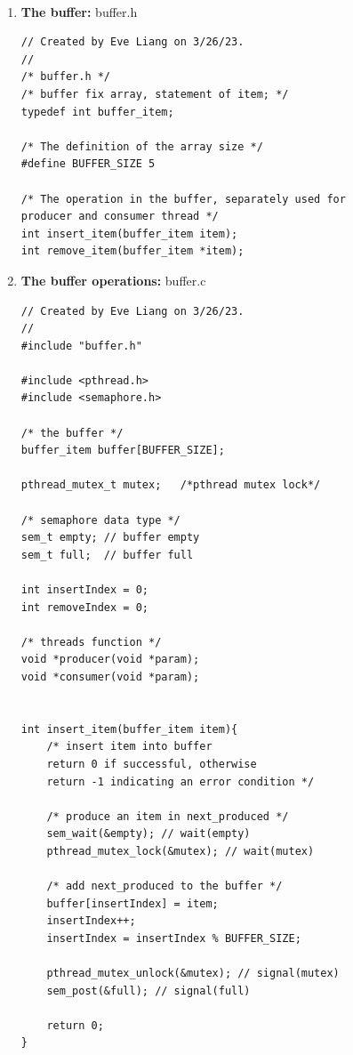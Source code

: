 \documentclass[12pt]{article}
\newenvironment{sol}[1][Solution]{\begin{trivlist}\item[\hskip\labelsep {\bfseries #1:}]}{\end{trivlist}}
\begin{document}
    \begin{sol}
    \hspace*{\fill}\\
    \begin{enumerate}
        \item[(a)]     \textbf{The buffer:}    buffer.h
    \begin{verbatim}
// Created by Eve Liang on 3/26/23.
//
/* buffer.h */
/* buffer fix array, statement of item; */
typedef int buffer_item;

/* The definition of the array size */
#define BUFFER_SIZE 5        

/* The operation in the buffer, separately used for 
producer and consumer thread */
int insert_item(buffer_item item);
int remove_item(buffer_item *item);
    \end{verbatim}

\item[(b)]\textbf{The buffer operations:} buffer.c
    \begin{verbatim}
// Created by Eve Liang on 3/26/23.
//
#include "buffer.h"

#include <pthread.h>
#include <semaphore.h>

/* the buffer */
buffer_item buffer[BUFFER_SIZE];

pthread_mutex_t mutex;   /*pthread mutex lock*/

/* semaphore data type */
sem_t empty; // buffer empty
sem_t full;  // buffer full

int insertIndex = 0;
int removeIndex = 0;

/* threads function */
void *producer(void *param);
void *consumer(void *param);


int insert_item(buffer_item item){
    /* insert item into buffer
    return 0 if successful, otherwise
    return -1 indicating an error condition */

    /* produce an item in next_produced */
    sem_wait(&empty); // wait(empty)
    pthread_mutex_lock(&mutex); // wait(mutex)

    /* add next_produced to the buffer */
    buffer[insertIndex] = item;
    insertIndex++;
    insertIndex = insertIndex % BUFFER_SIZE;

    pthread_mutex_unlock(&mutex); // signal(mutex)
    sem_post(&full); // signal(full)

    return 0;
}


\end{verbatim}
\end{enumerate}
\end{sol}
\end{document}
